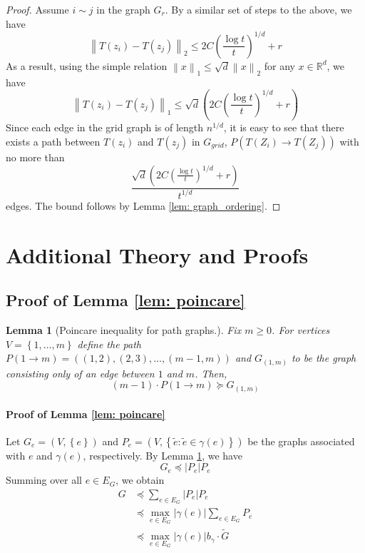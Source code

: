 \documentclass{article}
\newcommand{\Reals}{\mathbb{R}}
\newcommand{\norm}[1]{\left\lVert#1\right\rVert}
\newcommand{\abs}[1]{\left \lvert #1 \right \rvert}
\newcommand{\set}[1]{\left\{#1\right\}}
\newcommand{\1}{\mathbb{I}}
\newcommand{\Rd}{\Reals^d}
\theoremstyle{alden}
\theoremstyle{aldenthm}
\newtheorem{lemma}{Lemma}
\theoremstyle{definition}
\theoremstyle{remark}
\begin{document}
\begin{proof}	
	Assume $i \sim j$ in the graph $G_r$. By a similar set of steps to the above, we have
	\begin{equation*}
	\norm{T(z_i) - T(z_j)}_2 \leq 2C\left(\frac{\log t}{t}\right)^{1/d} + r
	\end{equation*}
	As a result, using the simple relation $\norm{x}_1 \leq \sqrt{d} \norm{x}_2$ for any $x \in \Rd$, we have
	\begin{equation*}
	\norm{T(z_i) - T(z_j)}_1 \leq \sqrt{d}(2C\left(\frac{\log t}{t}\right)^{1/d} + r)
	\end{equation*}
	Since each edge in the grid graph is of length $n^{1/d}$, it is easy to see that there exists a path between $T(z_i)$ and $T(z_j)$ in $G_{grid}$, $P(T(Z_i) \to T(Z_j))$ with no more than
	\begin{equation*}
	\frac{\sqrt{d}(2C\left(\frac{\log t}{t}\right)^{1/d} + r)}{t^{1/d}}
	\end{equation*}
	edges. The bound follows by Lemma \ref{lem: graph_ordering}.
\end{proof}

\section{Additional Theory and Proofs}

\subsection{Proof of Lemma \ref{lem: poincare}}

\begin{lemma}[Poincare inequality for path graphs.]
	\label{lem: path_poincare}
	Fix $m \geq 0$. For vertices $V = \set{1, \ldots,m}$ define the path $P(1 \to m) = ((1,2),(2,3),\ldots, (m-1,m))$ and $G_{(1,m)}$ to be the graph consisting only of an edge between $1$ and $m$. Then,
	\begin{equation*}
	(m - 1) \cdot P(1 \to m) \succeq G_{(1,m)}
	\end{equation*}
\end{lemma}

\paragraph{Proof of Lemma \ref{lem: poincare}}
Let $G_e = (V, \set{e})$ and $P_e = (V, \set{\widetilde{e}: \widetilde{e} \in \gamma(e)})$ be the graphs associated with $e$ and $\gamma(e)$, respectively. By Lemma \ref{lem: path_poincare}, we have
\begin{equation*}
G_{e} \preceq \abs{P_e} P_e
\end{equation*}
Summing over all $e \in E_G$, we obtain
\begin{align*}
G & \preceq \sum_{e \in E_G} \abs{P_e} P_e \\
& \preceq \max_{e \in E_G} \abs{\gamma(e)} \sum_{e \in E_G} P_e \\
& \preceq \max_{e \in E_G} \abs{\gamma(e)} b_{\gamma}\cdot \widetilde{G}
\end{align*}
\end{document}

